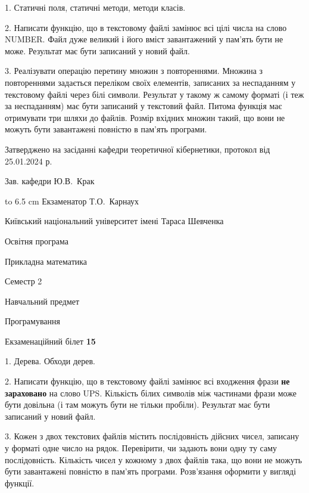 \documentclass[12pt, ukrainian]{article}
\begin{document}
{%
1. Статичні поля, статичні методи, методи класів.%
\par
2. Написати функцію, що в текстовому файлі замінює всі цілі числа на слово NUMBER. Файл дуже великий і його вміст завантажений у пам'ять бути не може. Результат має бути записаний у новий файл.

\par
3. Реалізувати операцію перетину множин з повтореннями. Множина з повтореннями задається переліком своїх елементів, записаних за неспаданням у текстовому файлі через білі символи. Результат у такому ж самому форматі (і теж за неспаданням) має бути записаний у текстовий файл. Питома функція має отримувати три шляхи до файлів. Розмір вхідних множин такий, що вони не можуть бути завантажені повністю в пам’ять програми.

}
{\smallskip\smallskip \begin {scriptsize} Затверджено на засіданні кафедри теоретичної кібернетики, протокол   від   25.01.2024 р.\par\smallskip\smallskip\smallskip\smallskip
{\parbox {6.5 cm} {Зав. кафедри \dotfill Ю.В.~Крак}}\hspace {0.7cm} {\hbox to 6.5 cm { Екзаменатор \dotfill Т.О.~Карнаух}} \end{scriptsize}}
\vspace{0.9cm}
{{\begin {scriptsize}\par
{ \center  Київський національний університет імені Тараса Шевченка \par}
{\parbox {5 cm}{Освітня програма \hfill}{\parbox {7 cm}{Прикладна математика\hfill}}\parbox {6 cm}{\hfill Семестр 2}}\par
{\parbox {5 cm} {Навчальний предмет \hfill}\parbox {7 cm}{Програмування \hfill}\parbox {6cm}{\hfill}\par}\vspace{-15pt} \end{scriptsize}}{\center Екзаменаційний білет \No \textbf { 15 }\par}}
{%
1. Дерева. Обходи дерев.%
\par
2. Написати функцію, що в текстовому файлі замінює всі входження фрази \textbf{не зараховано} на слово UPS. Кількість білих символів між частинами фрази може бути довільна (і там можуть бути не тільки пробіли). Результат має бути записаний у новий файл.

\par
3. Кожен з двох текстових файлів містить послідовність дійсних чисел, записану у форматі одне число на рядок.  Перевірити, чи задають вони одну ту саму послідовність. Кількість чисел у кожному з двох файлів така, що вони не можуть бути завантажені повністю в пам'ять програми. Розв'язання оформити у вигляді функції.

}
\end{document}
